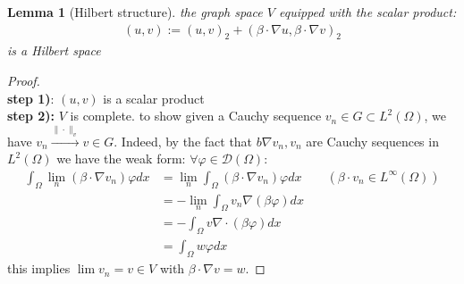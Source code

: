 \documentclass[a4paper,11pt,oneside,fleqn]{book}
\newtheorem{lemma}[theorem]{Lemma}
\theoremstyle{definition}
\theoremstyle{remark}
\begin{document}
\begin{lemma}[Hilbert structure]
		the graph space $V$ equipped with the scalar product:
	\begin{align*}
		(u, v):= (u, v)_2 + (\beta \cdot \nabla u, \beta \cdot \nabla v )_2
	\end{align*}
	is a Hilbert space
\end{lemma}
\begin{proof}\quad\\
\textbf{step 1)}: $(u, v)$ is a scalar product
\\
\textbf{step 2):} $V$ is complete. to show given a Cauchy sequence $v_n \in G \subset L^2(\Omega)$, we have $v_n \overset{\|\cdot \|_v}{\rightarrow} v \in G$. Indeed, by the fact that $b \nabla v_n, v_n$ are Cauchy sequences in $L^2(\Omega)$ we have the weak form: $\forall \varphi \in \mathcal{D}(\Omega)$:
\begin{align*}
	\int_\Omega \lim_n(\beta \cdot \nabla v_n) \varphi dx 
	&= \lim_n  \int_\Omega (\beta \cdot \nabla  v_n ) \varphi dx \qquad (\beta \cdot v_n \in L^\infty(\Omega))  \\
	&= -\lim_n  \int_\Omega v_n \nabla(\beta \varphi) dx \\
	&= -\int_\Omega v \nabla \cdot   (\beta \varphi) dx \\
	&= \int_\Omega w \varphi dx 
\end{align*}
this implies $\lim v_n = v \in V$ with $\beta \cdot \nabla v = w$. 
\end{proof}
\end{document}
